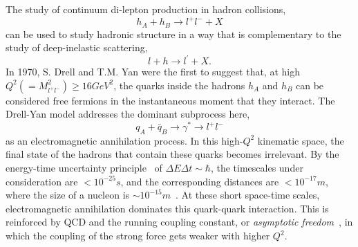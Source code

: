 The study of continuum di-lepton production in hadron collisions,
\begin{equation}
h_A +  h_B \rightarrow l^+ l^- + X
\label{eq:hh2ll}
\end{equation} 
can be used to study hadronic structure in a way that is complementary to the study of deep-inelastic scattering,
\begin{equation}
l + h \rightarrow l^\prime + X.
\label{eq:lh2lx}
\end{equation}
In 1970, S. Drell and T.M. Yan were the first to suggest that, at high $Q^2 (=M^2_{l^+ l^-}) \geq 16GeV^2$, the quarks inside the hadrons $h_A$ and $h_B$ can be considered free fermions in the instantaneous moment that they interact. The Drell-Yan model addresses the dominant subprocess here,
\begin{equation}
q_A + \bar{q}_B \rightarrow \gamma^* \rightarrow l^+ l^-
\label{eq:dy-process}
\end{equation} 
as an electromagnetic annihilation process. In this high-$Q^2$ kinematic space, the final state of the hadrons that contain these quarks becomes irrelevant. By the energy-time uncertainty principle~\cite{aHeisenberg:1927zz} of $\Delta E \Delta t \sim \hbar$, the timescales under consideration are $<10^{-25}s$, and the corresponding distances are $<10^{-17}m$, where the size of a nucleon is $\sim 10^{-15}m$~\cite{povh2002particles}. At these short space-time scales, electromagnetic annihilation dominates this quark-quark interaction. This is reinforced by QCD and the running coupling constant, or \emph{asymptotic freedom}~\cite{Bethke:2006ac}, in which the coupling of the strong force gets weaker with higher $Q^2$. 

